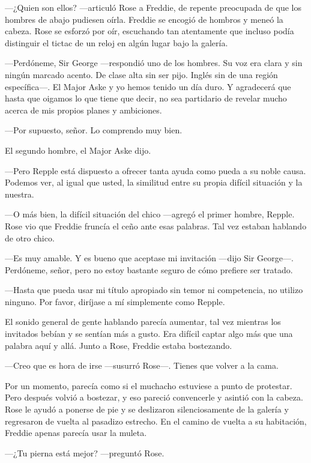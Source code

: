 {---¿Quien son ellos? ---articuló Rose a Freddie, de repente preocupada
de que los hombres de abajo pudiesen oírla. Freddie se encogió de
hombros y meneó la cabeza. Rose se esforzó por oír, escuchando tan
atentamente que incluso podía distinguir el tictac de un reloj en algún
lugar bajo la galería.}

{---Perdóneme, Sir George ---respondió uno de los hombres. Su voz era
clara y sin ningún marcado acento. De clase alta sin ser pijo. Inglés
sin de una región específica---. El Major Aske y yo hemos tenido un día
duro. Y agradecerá que hasta que oigamos lo que tiene que decir, no sea
partidario de revelar mucho acerca de mis propios planes y ambiciones.}

{---Por supuesto, señor. Lo comprendo muy bien.}

{El segundo hombre, el Major Aske dijo.}

{---Pero Repple está dispuesto a ofrecer tanta ayuda como pueda a su
noble causa. Podemos ver, al igual que usted, la similitud entre su
propia difícil situación y la nuestra.}

{---O más bien, la difícil situación del chico ---agregó el primer
hombre, Repple. Rose vio que Freddie fruncía el ceño ante esas palabras.
Tal vez estaban hablando de otro chico.}

{---Es muy amable. Y es bueno que aceptase mi invitación ---dijo Sir
George---. Perdóneme, señor, pero no estoy bastante seguro de cómo
prefiere ser tratado.}

{---Hasta que pueda usar mi título apropiado sin temor ni competencia,
no utilizo ninguno. Por favor, diríjase a mí simplemente como Repple.}

{El sonido general de gente hablando parecía aumentar, tal vez mientras
los invitados bebían y se sentían más a gusto. Era difícil captar algo
más que una palabra aquí y allá. Junto a Rose, Freddie estaba
bostezando.}

{---Creo que es hora de irse ---susurró Rose---. Tienes que volver a la
cama.}

{Por un momento, parecía como si el muchacho estuviese a punto de
protestar. Pero después volvió a bostezar, y eso pareció convencerle y
asintió con la cabeza. Rose le ayudó a ponerse de pie y se deslizaron
silenciosamente de la galería y regresaron de vuelta al pasadizo
estrecho. En el camino de vuelta a su habitación, Freddie apenas parecía
usar la muleta.}

{---¿Tu pierna está mejor? ---preguntó Rose.}

